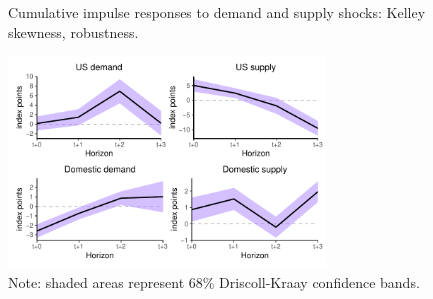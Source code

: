 \documentclass[12pt, a4paper]{article}
\begin{document}
\begin{figure}[H]
    \centering    
    \caption{Cumulative impulse responses to demand and supply shocks: Kelley skewness, robustness.}  
    \label{fig:kelley_robust}
    \includegraphics[width=0.75\textwidth]{Figures/kelley_demand_supply_LP_robust.pdf}
    \centering \caption*{Note: shaded areas represent 68\% Driscoll-Kraay confidence bands.}
\end{figure}
\end{document}
